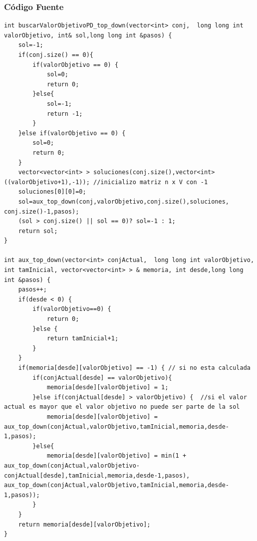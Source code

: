 \documentclass[7pt,a4paper]{article}
\begin{document}
\subsubsection{Código Fuente}
\begin{lstlisting}
int buscarValorObjetivoPD_top_down(vector<int> conj,  long long int valorObjetivo, int& sol,long long int &pasos) {
    sol=-1;
    if(conj.size() == 0){
        if(valorObjetivo == 0) {
            sol=0;
            return 0;
        }else{
            sol=-1;
            return -1;
        }
    }else if(valorObjetivo == 0) {
        sol=0;
        return 0;
    }
    vector<vector<int> > soluciones(conj.size(),vector<int>((valorObjetivo+1),-1)); //inicializo matriz n x V con -1
    soluciones[0][0]=0;
    sol=aux_top_down(conj,valorObjetivo,conj.size(),soluciones, conj.size()-1,pasos);
    (sol > conj.size() || sol == 0)? sol=-1 : 1;
    return sol;
}

int aux_top_down(vector<int> conjActual,  long long int valorObjetivo, int tamInicial, vector<vector<int> > & memoria, int desde,long long int &pasos) {
    pasos++;
    if(desde < 0) {
        if(valorObjetivo==0) {
            return 0;
        }else {
            return tamInicial+1;
        }
    }
    if(memoria[desde][valorObjetivo] == -1) { // si no esta calculada
        if(conjActual[desde] == valorObjetivo){
            memoria[desde][valorObjetivo] = 1;
        }else if(conjActual[desde] > valorObjetivo) {  //si el valor actual es mayor que el valor objetivo no puede ser parte de la sol
            memoria[desde][valorObjetivo] = aux_top_down(conjActual,valorObjetivo,tamInicial,memoria,desde-1,pasos);
        }else{
            memoria[desde][valorObjetivo] = min(1 + aux_top_down(conjActual,valorObjetivo-conjActual[desde],tamInicial,memoria,desde-1,pasos), aux_top_down(conjActual,valorObjetivo,tamInicial,memoria,desde-1,pasos));
        }
    }
    return memoria[desde][valorObjetivo];
}
\end{lstlisting}
\end{document}
